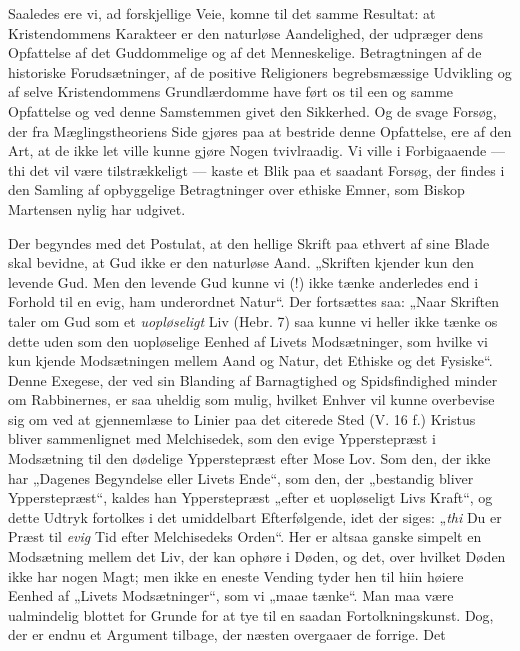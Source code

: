 \documentclass[12pt,a4paper,openany]{book}
\newcommand{\opage}[1]{\marginnote{\footnotesize\textit{[#1]}}}
\begin{document}
Saaledes ere vi, ad forskjellige Veie, komne til det
samme Resultat: at Kristendommens Karakteer er den naturløse
Aandelighed, der udpræger dens Opfattelse af det Guddommelige
og af det Menneskelige. Betragtningen af de
historiske Forudsætninger, af de positive Religioners begrebsmæssige
Udvikling og af selve Kristendommens Grundlærdomme
have ført os til een og samme Opfattelse og ved
denne Samstemmen givet den Sikkerhed. Og de svage Forsøg,
der fra Mæglingstheoriens Side gjøres paa at bestride denne
Opfattelse, ere af den Art, at de ikke let ville kunne gjøre Nogen
tvivlraadig. Vi ville i Forbigaaende --- thi det vil være
tilstrækkeligt --- kaste et Blik paa et saadant Forsøg, der
findes i den Samling af opbyggelige Betragtninger over ethiske
Emner, som Biskop Martensen nylig har udgivet.

Der begyndes med det Postulat, at den hellige Skrift paa
ethvert af sine Blade skal bevidne, at Gud ikke er den naturløse
Aand. „Skriften kjender kun den levende Gud. Men den
levende Gud kunne vi (!) ikke tænke anderledes end i Forhold
til en evig, ham underordnet Natur“. Der fortsættes
saa: „Naar Skriften taler om Gud som et \emph{uopløseligt}
Liv (Hebr. 7) saa kunne vi heller ikke tænke os dette uden
som den uopløselige Eenhed af Livets Modsætninger, som
hvilke vi kun kjende Modsætningen mellem Aand og Natur,
det Ethiske og det Fysiske“. Denne Exegese, der ved sin
Blanding af Barnagtighed og Spidsfindighed minder om
Rabbinernes, er saa uheldig som mulig, hvilket Enhver vil
kunne overbevise sig om ved at gjennemlæse to Linier paa
det citerede Sted (V. 16 f.) Kristus bliver sammenlignet
med Melchisedek, som den evige Ypperstepræst i Modsætning
til den dødelige Ypperstepræst efter Mose Lov. Som den,
der ikke har „Dagenes Begyndelse eller Livets Ende“, som
den, der „bestandig bliver Ypperstepræst“, kaldes han Ypperstepræst
„efter et uopløseligt Livs Kraft“, og dette Udtryk fortolkes
i det umiddelbart Efterfølgende, idet der siges: „\emph{thi}
\opage{452}Du er Præst til \emph{evig} Tid efter Melchisedeks Orden“. Her
er altsaa ganske simpelt en Modsætning mellem det Liv, der
kan ophøre i Døden, og det, over hvilket Døden ikke har
nogen Magt; men ikke en eneste Vending tyder hen til hiin
høiere Eenhed af „Livets Modsætninger“, som vi „maae
tænke“. Man maa være ualmindelig blottet for Grunde for
at tye til en saadan Fortolkningskunst. Dog, der er endnu
et Argument tilbage, der næsten overgaaer de forrige. Det
\end{document}
